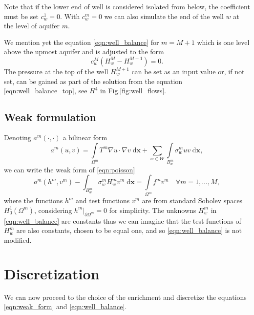 \documentclass[preprint,12pt,authoryear]{elsarticle}
\newcommand{\fig}[1]{\hyperref[#1]{Fig.\ref{#1}}}
\newcommand{\dd}{\; \mathrm{d}}
\newcommand{\bx}{\mathbf{x}}
\begin{document}
Note that if the lower end of well is considered isolated from below, the coefficient must be set $c^1_w = 0$.
With $c^m_w = 0$ we can also simulate the end of the well $w$ at the level of aquifer $m$.

We mention yet the equation \eqref{eqn:well_balance} for $m=M+1$ which is one level above the upmost aquifer
and is adjusted to the form
\begin{equation} \label{eqn:well_balance_top}
  c^M_w\left( H^{M}_w-H^{M+1}_w \right) = 0.
\end{equation}
The pressure at the top of the well $H^{M+1}_w$ can be set as an input value or, if not set, can be gained 
as part of the solution from the equation \eqref{eqn:well_balance_top}, see $H^4$ in \fig{fig:well_flows}.

\subsection{Weak formulation}
Denoting $a^m(\cdot, \cdot)$ a bilinear form 
\begin{equation} \label{eqn:bilinear_form_a}
  a^m(u,v) = \int \limits_{\Omega^m} T^m \nabla u \cdot \nabla v \dd\bx
        + \sum \limits_{w\in \mathcal{W}} \int \limits_{B^m_w} \sigma^m_w u v \dd\bx,
\end{equation}
we can write the weak form of \eqref{eqn:poisson}
\begin{equation} \label{eqn:weak_form}
  a^m(h^m,v^m) - \int_{B_w^m}\sigma_w^m H_w^m v^m \dd\bx
  = \int \limits_{\Omega^m} f^mv^m%
  \quad \forall m=1,\ldots,M,
\end{equation}
where the functions $h^m$ and test functions $v^m$ are from standard Sobolev spaces $H^1_0(\Omega^m)$,
considering $h^m|_{\partial\Omega^m}=0$ for simplicity.
The unknowns $H^m_w$ in \eqref{eqn:well_balance} are constants thus we can imagine that the test functions of 
$H^m_w$ are also constants, chosen to be equal one, and so \eqref{eqn:well_balance} is not modified.

\section{Discretization}
\label{sec:pum_methods}
We can now proceed to the choice of the enrichment and discretize the equations
\eqref{eqn:weak_form} and \eqref{eqn:well_balance}.
\end{document}
